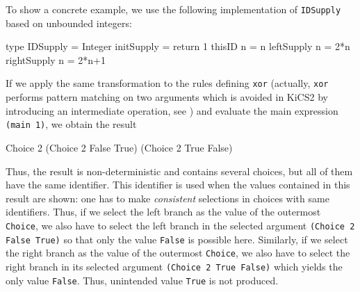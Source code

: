 \documentclass{llncs}
\newcommand{\code}[1]{\mbox{\small\texttt{#1}}}
\begin{document}
To show a concrete example, we use the following implementation
of \code{IDSupply} based on unbounded integers:
%
\begin{haskell}
  type IDSupply = Integer
  initSupply    = return 1
  thisID      n = n
  leftSupply  n = 2*n
  rightSupply n = 2*n+1
\end{haskell}
%
If we apply the same transformation to the rules defining \code{xor}
(actually, \code{xor} performs pattern matching on two arguments
which is avoided in KiCS2 by introducing an intermediate operation,
see \cite{BrasselFischerHanusReck11}) and evaluate the main expression
\code{(main 1)},
we obtain the result
\begin{haskell}
  Choice 2 (Choice 2 False True) (Choice 2 True False)
\end{haskell}
Thus, the result is non-deterministic and contains several choices,
but all of them have the same identifier.
This identifier is used when the values contained in this result
are shown: one has to make \emph{consistent} selections in choices with
same identifiers. Thus, if we select the left branch as the value
of the outermost \code{Choice}, we also have to select the left branch
in the selected argument \code{(Choice 2 False True)} so that only
the value \code{False} is possible here.
Similarly, if we select the right branch as the value of the outermost
\code{Choice}, we also have to select the right branch in
its selected argument \code{(Choice 2 True False)} which yields the only
value \code{False}.
Thus, unintended value \code{True} is not produced.
\end{document}
